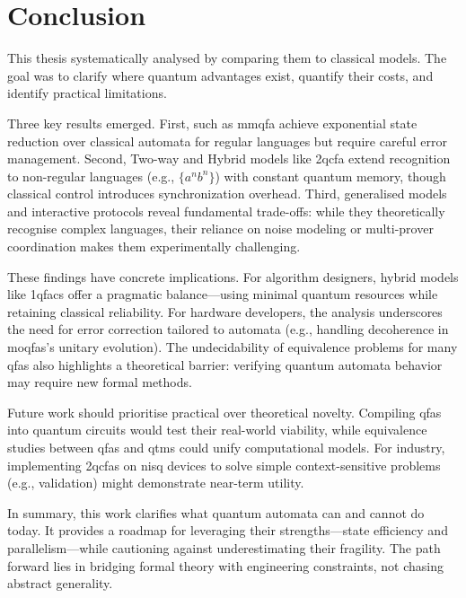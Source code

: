 \chapter{Conclusion}
\label{chap:conclusion}

This thesis systematically analysed  by comparing them to classical models. The goal was to clarify where quantum advantages exist, quantify their costs, and identify practical limitations.

Three key results emerged. First,  such as %
\gls{mmqfa} achieve exponential state reduction over classical automata for regular languages but require careful error management. Second, Two-way and Hybrid models like \gls{2qcfa} extend recognition to non-regular languages (e.g., $\{a^n b^n\}$) with constant quantum memory, though classical control introduces synchronization overhead. Third, generalised models and interactive protocols reveal fundamental trade-offs: while they theoretically recognise complex languages, their reliance on noise modeling or multi-prover coordination makes them experimentally challenging.

These findings have concrete implications. For algorithm designers, hybrid models like \glspl{1qfac} offer a pragmatic balance—using minimal quantum resources while retaining classical reliability. For hardware developers, the analysis underscores the need for error correction tailored to automata (e.g., handling decoherence in \glspl{moqfa}'s unitary evolution). The undecidability of equivalence problems for many \glspl{qfa} also highlights a theoretical barrier: verifying quantum automata behavior may require new formal methods.

Future work should prioritise practical over theoretical novelty. Compiling \glspl{qfa} into quantum circuits would test their real-world viability, while equivalence studies between \glspl{qfa} and \glspl{qtm} could unify computational models. For industry, implementing \glspl{2qcfa} on \gls{nisq} devices to solve simple context-sensitive problems (e.g.,  validation) might demonstrate near-term utility.

In summary, this work clarifies what quantum automata can and cannot do today. It provides a roadmap for leveraging their strengths—state efficiency and parallelism—while cautioning against underestimating their fragility. The path forward lies in bridging formal theory with engineering constraints, not chasing abstract generality.